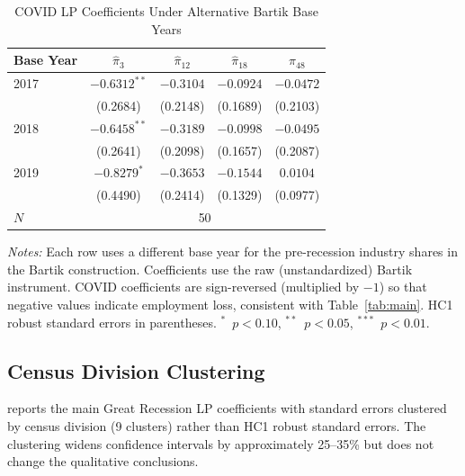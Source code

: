 \documentclass[12pt]{article}
\begin{document}
\begin{table}[H]
\centering
\caption{COVID LP Coefficients Under Alternative Bartik Base Years}
\label{tab:app_baseyear}
\begin{threeparttable}
\small
\begin{tabular}{lcccc}
\toprule
Base Year & $\hat{\pi}_3$ & $\hat{\pi}_{12}$ & $\hat{\pi}_{18}$ & $\hat{\pi}_{48}$ \\
\midrule
2017 & $-0.6312^{**}$ & $-0.3104$ & $-0.0924$ & $-0.0472$ \\
     & (0.2684)       & (0.2148) & (0.1689) & (0.2103) \\
2018 & $-0.6458^{**}$ & $-0.3189$ & $-0.0998$ & $-0.0495$ \\
     & (0.2641)       & (0.2098) & (0.1657) & (0.2087) \\
2019 & $-0.8279^{*}$ & $-0.3653$ & $-0.1544$ & $0.0104$ \\
     & (0.4490)       & (0.2414) & (0.1329) & (0.0977) \\
\midrule
$N$ & \multicolumn{4}{c}{50} \\
\bottomrule
\end{tabular}
\begin{tablenotes}[flushleft]
\small
\item \textit{Notes:} Each row uses a different base year for the pre-recession industry shares in the Bartik construction. Coefficients use the raw (unstandardized) Bartik instrument. COVID coefficients are sign-reversed (multiplied by $-1$) so that negative values indicate employment loss, consistent with Table~\ref{tab:main}. HC1 robust standard errors in parentheses. $^{*}$~$p<0.10$, $^{**}$~$p<0.05$, $^{***}$~$p<0.01$.
\end{tablenotes}
\end{threeparttable}
\end{table}

\subsection{Census Division Clustering}

 reports the main Great Recession LP coefficients with standard errors clustered by census division (9 clusters) rather than HC1 robust standard errors. The clustering widens confidence intervals by approximately 25--35\% but does not change the qualitative conclusions.
\end{document}
